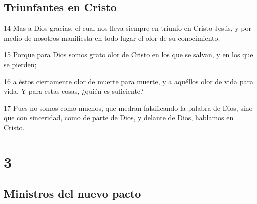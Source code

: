 \section*{Triunfantes en Cristo}

\par 14 Mas a Dios gracias, el cual nos lleva siempre en triunfo en Cristo Jesús, y por medio de nosotros manifiesta en todo lugar el olor de su conocimiento.
\par 15 Porque para Dios somos grato olor de Cristo en los que se salvan, y en los que se pierden;
\par 16 a éstos ciertamente olor de muerte para muerte, y a aquéllos olor de vida para vida. Y para estas cosas, ¿quién es suficiente?
\par 17 Pues no somos como muchos, que medran falsificando la palabra de Dios, sino que con sinceridad, como de parte de Dios, y delante de Dios, hablamos en Cristo.

\chapter{3}

\section*{Ministros del nuevo pacto}

